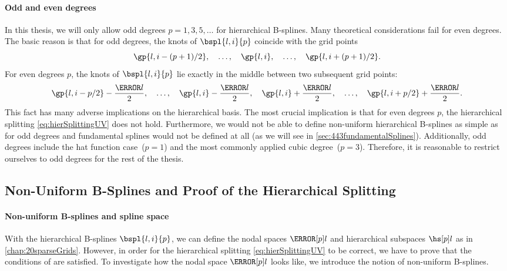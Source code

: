 \paragraph{Odd and even degrees}

In this thesis, we will only allow odd degrees $p = 1, 3, 5, \dotsc$
for hierarchical B-splines.
Many theoretical considerations fail for even degrees.
The basic reason is that for odd degrees, the knots of
$\bspl{l,i}{p}$ coincide with the grid points \cite{Valentin14Hierarchische}
\begin{equation}
  \gp{l,i-(p+1)/2},\quad
  \dotsc,\quad
  \gp{l,i},\quad
  \dotsc,\quad
  \gp{l,i+(p+1)/2}.
\end{equation}
For even degrees $p$, the knots of $\bspl{l,i}{p}$ lie exactly in
the middle between two subsequent grid points:
\begin{equation}
  \gp{l,i-p/2} - \frac{\ms{l}}{2},\quad
  \dotsc,\quad
  \gp{l,i} - \frac{\ms{l}}{2},\quad
  \gp{l,i} + \frac{\ms{l}}{2},\quad
  \dotsc,\quad
  \gp{l,i+p/2} + \frac{\ms{l}}{2}.
\end{equation}
This fact has many adverse implications on the hierarchical basis.
The most crucial implication is
that for even degrees $p$,
the hierarchical splitting \eqref{eq:hierSplittingUV} does not hold.
Furthermore,
we would not be able to define non-uniform hierarchical B-splines as
simple as for odd degrees and
fundamental splines would not be defined at all
(as we will see in \cref{sec:443fundamentalSplines}).
Additionally,
odd degrees include the hat function case~($p = 1$) and the
most commonly applied cubic degree~($p = 3$).
Therefore,
it is reasonable to restrict ourselves to odd degrees
for the rest of the thesis.



\subsection{Non-Uniform B-Splines and Proof of the Hierarchical Splitting}
\label{sec:312proofHierarchicalSplitting}

\paragraph{Non-uniform B-splines and spline space}

With the hierarchical B-splines $\bspl{l,i}{p}$, we can define
the nodal spaces $\nsbspl{l}{p}$ and hierarchical subspaces $\hsbspl{l}{p}$
as in \cref{chap:20sparseGrids}.
However, in order for the hierarchical splitting \eqref{eq:hierSplittingUV}
to be correct, we have to prove that the conditions of
 are satisfied.
To investigate how the nodal space $\nsbspl{l}{p}$ looks like,
we introduce the notion of non-uniform B-splines.

